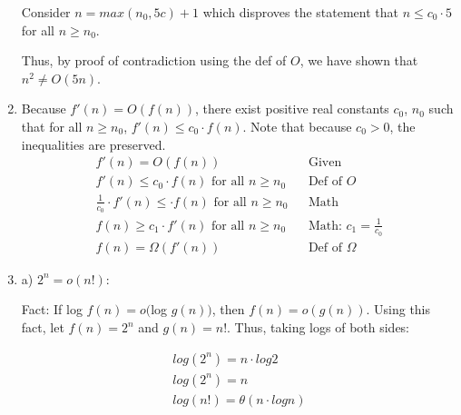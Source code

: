 \documentclass[a4paper]{report}
\begin{document}
\begin{enumerate}
    Consider $n = max(n_{0}, 5c) + 1$ which disproves the statement that $n \leq c_{0} \cdot 5$ for all $n \geq n_{0}$.

    Thus, by proof of contradiction using the def of $O$, we have shown that $n^2 \neq O(5n)$.

    \par
    \bigskip
    \setcounter{equation}{0}
    
    \item 
      Because $f'(n) = O(f(n))$, there exist positive real constants $c_{0}$, $n_{0}$ such that for all $n \geq n_{0}$, 
      $f'(n) \leq c_{0} \cdot f(n)$. Note that because $c_{0} > 0$, the inequalities are preserved.
    \begin{align}
      f'(n) = O(f(n))                                   &&\text{Given }\\
      f'(n) \leq c_{0} \cdot f(n) \text{ for all } n \geq n_{0}          &&\text{Def of $O$}\\
      \frac{1}{c_{0}} \cdot f'(n) \leq \cdot f(n) \text{ for all } n \geq n_{0}          &&\text{Math}\\
      f(n) \geq c_{1} \cdot f'(n) \text{ for all } n \geq n_{0}          &&\text{Math: $c_{1} = \frac{1}{c_{0}}$}\\
      f(n)  = \Omega(f'(n))                               &&\text{Def of $\Omega$}
    \end{align}

    
    \pagebreak
    \bigskip
    \setcounter{equation}{0}

    \item 

      a) 
      $2^n = o(n!)$:

      Fact: If log $f(n) = o($log $g(n))$, then $f(n) = o(g(n))$. 
      Using this fact, let $f(n) = 2^n$ and $g(n) = n!$. Thus, taking logs of both sides:

      \begin{align}
        log(2^n) = n \cdot log 2 \\
        log(2^n) = n \\
        log(n!) = \theta(n \cdot log n) 
      \end{align}


\end{enumerate}
\end{document}
